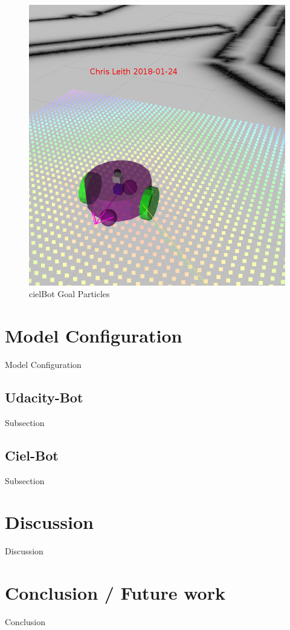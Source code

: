 \documentclass[10pt,journal,compsoc]{IEEEtran}
\begin{document}
\begin{figure}[h]
      \centering
      \includegraphics[width=\linewidth]{../Assets/writeupImages/cielBot_rvizGoal.png}
      \caption{cielBot Goal Particles }
      \label{fig:cielBot Goal Particles}
\end{figure}


\section{Model Configuration}
Model Configuration

\subsection{Udacity-Bot}
Subsection

\subsection{Ciel-Bot}
Subsection


\section{Discussion}
Discussion

\section{Conclusion / Future work}
Conclusion
\end{document}
